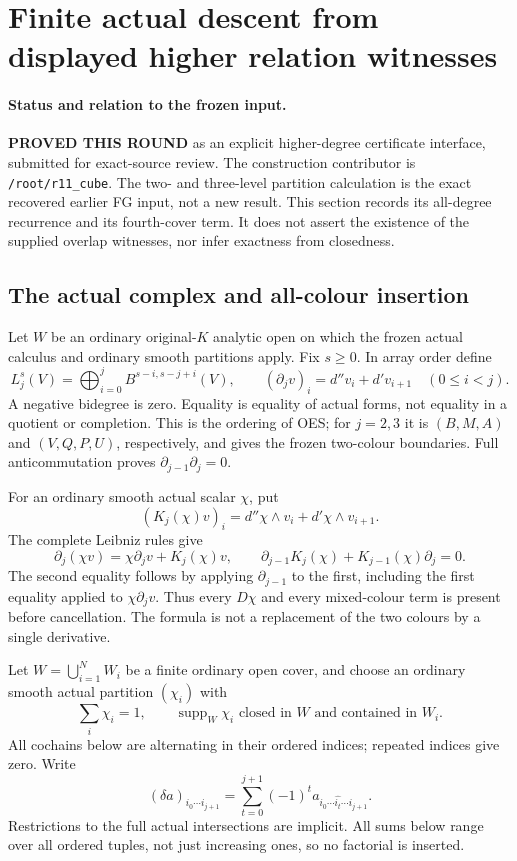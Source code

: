 \section{Finite actual descent from displayed higher relation witnesses}
\label{sec:r11-finite-higher-relation-descent}

\paragraph{Status and relation to the frozen input.}
\textbf{PROVED THIS ROUND} as an explicit higher-degree certificate
interface, submitted for exact-source review.  The construction
contributor is \texttt{/root/r11\_cube}.  The two- and three-level
partition calculation is the exact recovered earlier FG input,
not a new result.  This section records its all-degree recurrence
and its fourth-cover term.  It does not assert the existence of
the supplied overlap witnesses, nor infer exactness from closedness.

\subsection{The actual complex and all-colour insertion}

Let $W$ be an ordinary original-$K$ analytic open on which the
frozen actual calculus and ordinary smooth partitions apply.
Fix $s\ge0$.  In array order define
\[
 L_j^s(V)=\bigoplus_{i=0}^j B^{s-i,s-j+i}(V),\qquad
 (\partial_jv)_i=d''v_i+d'v_{i+1}\quad(0\le i<j).
 \tag{FHD1}
\]
A negative bidegree is zero.  Equality is equality of actual
forms, not equality in a quotient or completion.  This is the
ordering of OES; for $j=2,3$ it is $(B,M,A)$ and $(V,Q,P,U)$,
respectively, and gives the frozen two-colour boundaries.
Full anticommutation proves $\partial_{j-1}\partial_j=0$.

For an ordinary smooth actual scalar $\chi$, put
\[
 (K_j(\chi)v)_i=d''\chi\wedge v_i+d'\chi\wedge v_{i+1}.
 \tag{FHD2}
\]
The complete Leibniz rules give
\[
 \partial_j(\chi v)=\chi\partial_jv+K_j(\chi)v,\qquad
 \partial_{j-1}K_j(\chi)+K_{j-1}(\chi)\partial_j=0.
 \tag{FHD3}
\]
The second equality follows by applying $\partial_{j-1}$ to
the first, including the first equality applied to
$\chi\partial_jv$.  Thus every $D\chi$ and every mixed-colour
term is present before cancellation.  The formula is not a
replacement of the two colours by a single derivative.

Let $W=\bigcup_{i=1}^N W_i$ be a finite ordinary open cover,
and choose an ordinary smooth actual partition $(\chi_i)$ with
\[
 \sum_i\chi_i=1,\qquad \operatorname{supp}_W\chi_i
                      \text{ closed in }W\text{ and contained in }W_i.
 \tag{FHD4}
\]
All cochains below are alternating in their ordered indices;
repeated indices give zero.  Write
\[
 (\delta a)_{i_0\cdots i_{j+1}}
    =\sum_{t=0}^{j+1}(-1)^t
                 a_{i_0\cdots\widehat{i_t}\cdots i_{j+1}}.
 \tag{FHD5}
\]
Restrictions to the full actual intersections are implicit.
All sums below range over all ordered tuples, not just increasing
ones, so no factorial is inserted.

